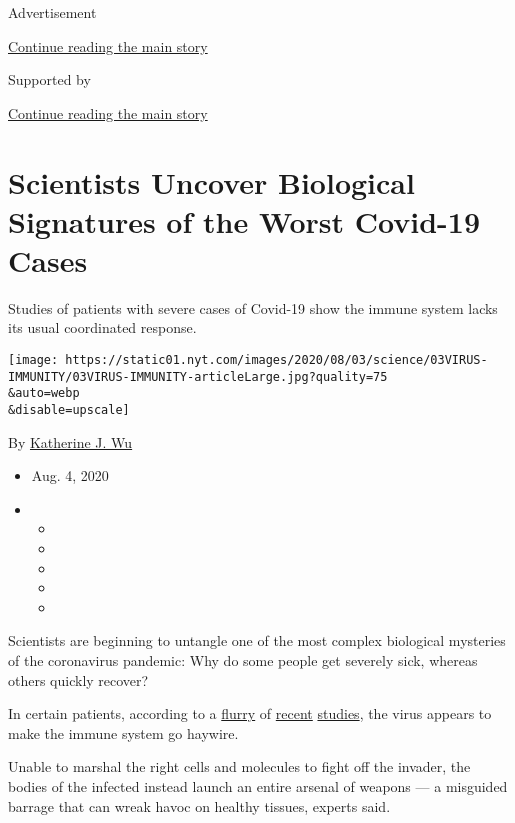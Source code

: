 Advertisement

\protect\hyperlink{after-top}{Continue reading the main story}

Supported by

\protect\hyperlink{after-sponsor}{Continue reading the main story}

\hypertarget{scientists-uncover-biological-signatures-of-the-worst-covid-19-cases}{%
\section{Scientists Uncover Biological Signatures of the Worst Covid-19
Cases}\label{scientists-uncover-biological-signatures-of-the-worst-covid-19-cases}}

Studies of patients with severe cases of Covid-19 show the immune system
lacks its usual coordinated response.

\texttt{[image: https://static01.nyt.com/images/2020/08/03/science/03VIRUS-IMMUNITY/03VIRUS-IMMUNITY-articleLarge.jpg?quality=75\\\&auto=webp\\\&disable=upscale]}

By \href{https://www.nytimes.com/by/katherine-j--wu}{Katherine J. Wu}

\begin{itemize}
\item
  Aug. 4, 2020
\item
  \begin{itemize}
  \item
  \item
  \item
  \item
  \item
  \end{itemize}
\end{itemize}

Scientists are beginning to untangle one of the most complex biological
mysteries of the coronavirus pandemic: Why do some people get severely
sick, whereas others quickly recover?

In certain patients, according to a
\href{https://www.nature.com/articles/s41586-020-2588-y}{flurry} of
\href{https://science.sciencemag.org/content/early/2020/07/15/science.abc8511}{recent}
\href{https://immunology.sciencemag.org/content/5/49/eabd7114}{studies},
the virus appears to make the immune system go haywire.

Unable to marshal the right cells and molecules to fight off the
invader, the bodies of the infected instead launch an entire arsenal of
weapons --- a misguided barrage that can wreak havoc on healthy tissues,
experts said.

